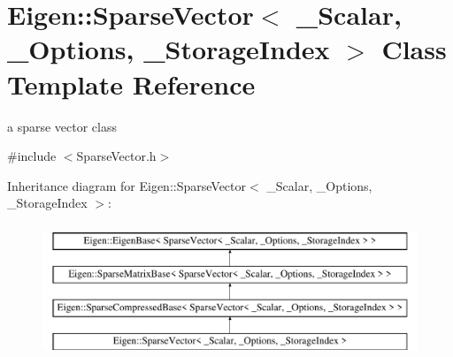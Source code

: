 \hypertarget{class_eigen_1_1_sparse_vector}{}\section{Eigen\+::Sparse\+Vector$<$ \+\_\+\+Scalar, \+\_\+\+Options, \+\_\+\+Storage\+Index $>$ Class Template Reference}
\label{class_eigen_1_1_sparse_vector}


a sparse vector class  




{\ttfamily \#include $<$Sparse\+Vector.\+h$>$}

Inheritance diagram for Eigen\+::Sparse\+Vector$<$ \+\_\+\+Scalar, \+\_\+\+Options, \+\_\+\+Storage\+Index $>$\+:\begin{figure}[H]
\begin{center}
\leavevmode
\includegraphics[height=4.000000cm]{class_eigen_1_1_sparse_vector}
\end{center}
\end{figure}
